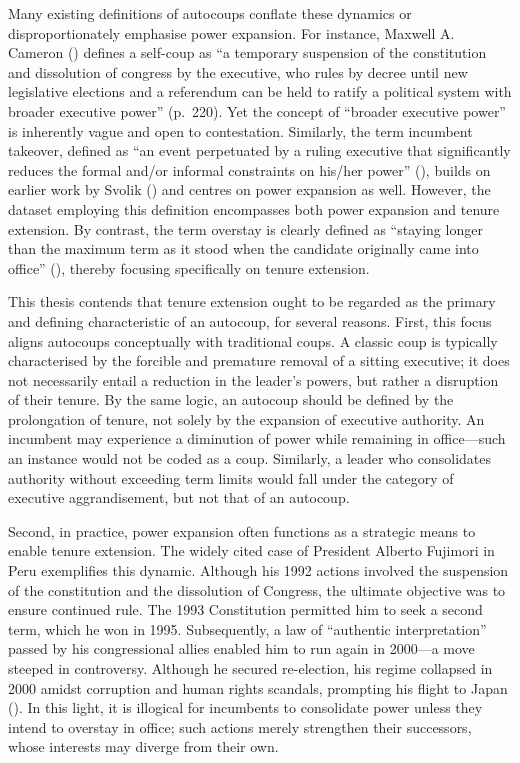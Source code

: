 \documentclass[
  12pt,
]{report}
\begin{document}
Many existing definitions of autocoups conflate these dynamics or
disproportionately emphasise power expansion. For instance, Maxwell A.
Cameron () defines a self-coup as ``a
temporary suspension of the constitution and dissolution of congress by
the executive, who rules by decree until new legislative elections and a
referendum can be held to ratify a political system with broader
executive power'' (p.~220). Yet the concept of ``broader executive
power'' is inherently vague and open to contestation. Similarly, the
term incumbent takeover, defined as ``an event perpetuated by a ruling
executive that significantly reduces the formal and/or informal
constraints on his/her power'' (), builds on earlier work by Svolik
() and centres on power expansion as
well. However, the dataset employing this definition encompasses both
power expansion and tenure extension. By contrast, the term overstay is
clearly defined as ``staying longer than the maximum term as it stood
when the candidate originally came into office''
(), thereby focusing specifically on tenure extension.

This thesis contends that tenure extension ought to be regarded as the
primary and defining characteristic of an autocoup, for several reasons.
First, this focus aligns autocoups conceptually with traditional coups.
A classic coup is typically characterised by the forcible and premature
removal of a sitting executive; it does not necessarily entail a
reduction in the leader's powers, but rather a disruption of their
tenure. By the same logic, an autocoup should be defined by the
prolongation of tenure, not solely by the expansion of executive
authority. An incumbent may experience a diminution of power while
remaining in office---such an instance would not be coded as a coup.
Similarly, a leader who consolidates authority without exceeding term
limits would fall under the category of executive aggrandisement, but
not that of an autocoup.

Second, in practice, power expansion often functions as a strategic
means to enable tenure extension. The widely cited case of President
Alberto Fujimori in Peru exemplifies this dynamic. Although his 1992
actions involved the suspension of the constitution and the dissolution
of Congress, the ultimate objective was to ensure continued rule. The
1993 Constitution permitted him to seek a second term, which he won in
1995. Subsequently, a law of ``authentic interpretation'' passed by his
congressional allies enabled him to run again in 2000---a move steeped
in controversy. Although he secured re-election, his regime collapsed in
2000 amidst corruption and human rights scandals, prompting his flight
to Japan (). In this light, it is
illogical for incumbents to consolidate power unless they intend to
overstay in office; such actions merely strengthen their successors,
whose interests may diverge from their own.
\end{document}
